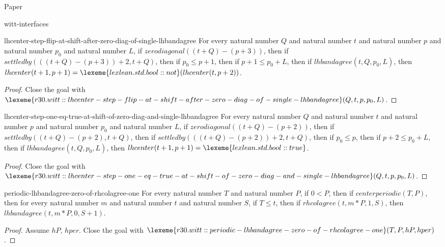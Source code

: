 \begin{lexlean}{Paper}
\begin{section}{witt-interfaces}
  \begin{theorem}{lhcenter-step-flip-at-shift-after-zero-diag-of-single-lhbandagree}
  For every natural number \(Q\) and natural number \(t\) and natural number \(p\) and natural number \(p_0\) and natural number \(L\), if \(zerodiagonal((t + Q) - (p + 3))\), then if \(settledby(((t + Q) - (p + 3)) + 2, t + Q)\), then if \(p_0 ≤ p + 1\), then if \(p + 1 ≤ p_0 + L\), then if \(lhbandagree(t, Q, p_0, L)\), then \(lhcenter(t + 1, p + 1) = \lexeme{lexlean.std.bool::not}(lhcenter(t, p + 2))\).
  \begin{proof}
  Close the goal with \(\lexeme{r30.witt::lhcenter-step-flip-at-shift-after-zero-diag-of-single-lhbandagree}(Q, t, p, p_0, L)\).
  \end{proof}
  \end{theorem}

  \begin{theorem}{lhcenter-step-one-eq-true-at-shift-of-zero-diag-and-single-lhbandagree}
  For every natural number \(Q\) and natural number \(t\) and natural number \(p\) and natural number \(p_0\) and natural number \(L\), if \(zerodiagonal((t + Q) - (p + 2))\), then if \(settledby((t + Q) - (p + 2), t + Q)\), then if \(settledby(((t + Q) - (p + 2)) + 2, t + Q)\), then if \(p_0 ≤ p\), then if \(p + 2 ≤ p_0 + L\), then if \(lhbandagree(t, Q, p_0, L)\), then \(lhcenter(t + 1, p + 1) = \lexeme{lexlean.std.bool::true}\).
  \begin{proof}
  Close the goal with \(\lexeme{r30.witt::lhcenter-step-one-eq-true-at-shift-of-zero-diag-and-single-lhbandagree}(Q, t, p, p_0, L)\).
  \end{proof}
  \end{theorem}

  \begin{theorem}{periodic-lhbandagree-zero-of-rhcolagree-one}
  For every natural number \(T\) and natural number \(P\), if \(0 < P\), then if \(centerperiodic(T, P)\), then for every natural number \(m\) and natural number \(t\) and natural number \(S\), if \(T ≤ t\), then if \(rhcolagree(t, m * P, 1, S)\), then \(lhbandagree(t, m * P, 0, S + 1)\).
  \begin{proof}
  Assume \(hP\), \(hper\).
  Close the goal with \(\lexeme{r30.witt::periodic-lhbandagree-zero-of-rhcolagree-one}(T, P, hP, hper)\).
  \end{proof}
  \end{theorem}


\end{section}
\end{lexlean}
